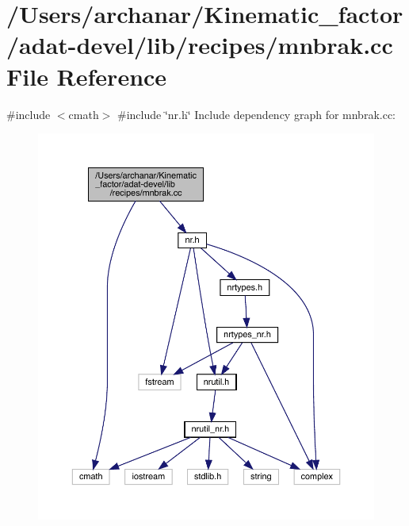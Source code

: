 \hypertarget{adat-devel_2lib_2recipes_2mnbrak_8cc}{}\section{/\+Users/archanar/\+Kinematic\+\_\+factor/adat-\/devel/lib/recipes/mnbrak.cc File Reference}
\label{adat-devel_2lib_2recipes_2mnbrak_8cc}
{\ttfamily \#include $<$cmath$>$}\newline
{\ttfamily \#include \char`\"{}nr.\+h\char`\"{}}\newline
Include dependency graph for mnbrak.\+cc\+:
\nopagebreak
\begin{figure}[H]
\begin{center}
\leavevmode
\includegraphics[width=350pt]{d3/da9/adat-devel_2lib_2recipes_2mnbrak_8cc__incl}
\end{center}
\end{figure}
